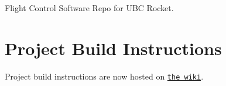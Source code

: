 Flight Control Software Repo for U\-B\-C Rocket.

\section*{Project Build Instructions}

Project build instructions are now hosted on \href{https://github.com/UBC-Rocket/majorTom/wiki/Project-Build-Instructions}{\tt the wiki}. 